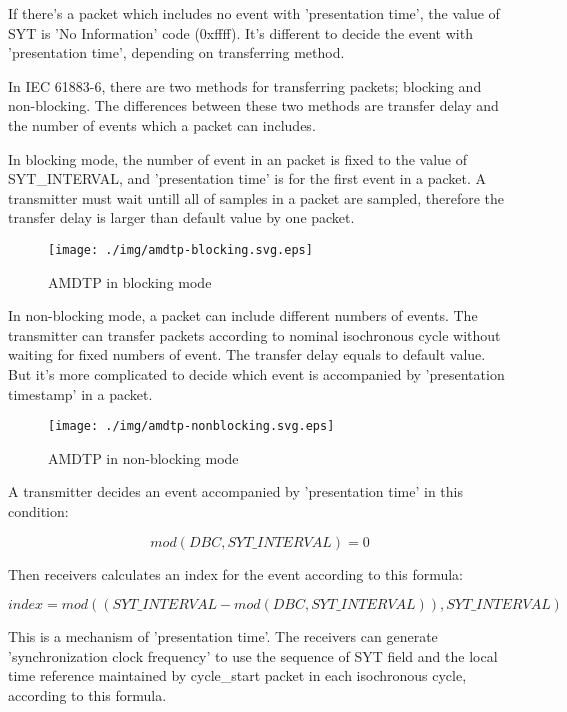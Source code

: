 \documentclass[onecolumn]{article}
\begin{document}
If there's a packet which includes no event with 'presentation time', the value of SYT is 'No Information' code (0xffff). It's different to decide the event with 'presentation time', depending on transferring method.

In IEC 61883-6\cite{iec61883-6-1,iec61883-6-2}, there are two methods for transferring packets; blocking and non-blocking. The differences between these two methods are transfer delay and the number of events which a packet can includes.

In blocking mode, the number of event in an packet is fixed to the value of SYT\_INTERVAL, and 'presentation time' is for the first event in a packet. A transmitter must wait untill all of samples in a packet are sampled, therefore the transfer delay is larger than default value by one packet.

\begin{figure}[H]
	\centering
	\texttt{[image: ./img/amdtp-blocking.svg.eps]}
	\caption{{AMDTP in blocking mode}}
	\label{amdtp-blocking}
\end{figure}

In non-blocking mode, a packet can include different numbers of events. The transmitter can transfer packets according to nominal isochronous cycle without waiting for fixed numbers of event. The transfer delay equals to default value. But it's more complicated to decide which event is accompanied by 'presentation timestamp' in a packet.

\begin{figure}[H]
	\centering
	\texttt{[image: ./img/amdtp-nonblocking.svg.eps]}
	\caption{{AMDTP in non-blocking mode}}
	\label{amdtp-nonblockingstart}
\end{figure}

A transmitter decides an event accompanied by 'presentation time' in this condition:

\begin{equation}
	mod(DBC, SYT\_INTERVAL) = 0
\end{equation}

Then receivers calculates an index for the event according to this formula:

\begin{equation}
	index = mod((SYT\_INTERVAL - mod(DBC, SYT\_INTERVAL)), SYT\_INTERVAL)
\end{equation}

This is a mechanism of 'presentation time'. The receivers can generate 'synchronization clock frequency' to use the sequence of SYT field and the local time reference maintained by cycle\_start packet in each isochronous cycle, according to this formula.
\end{document}
